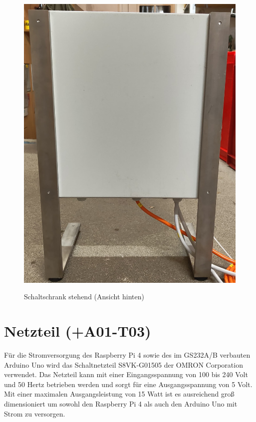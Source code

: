 \begin{figure}[H]
\begin{minipage}[b]{.4\linewidth}
		\includegraphics[width=\linewidth]{../ref/Schaltschrank_stehend_hinten.jpeg}
		\label{fig:schaltschrankstehendhinten}
		\caption{Schaltschrank stehend (Ansicht hinten)}
	\end{minipage}
\end{figure}

\section{Netzteil (+A01-T03)}
Für die Stromversorgung des Raspberry Pi 4 sowie des im GS232A/B verbauten Arduino Uno wird das Schaltnetzteil S8VK-G01505 der OMRON Corporation verwendet. Das Netzteil kann mit einer Eingangsspannung von 100 bis 240 Volt und 50 Hertz betrieben werden und sorgt für eine Ausgangsspannung von 5 Volt. Mit einer maximalen Ausgangsleistung von  15 Watt ist es ausreichend groß dimensioniert um sowohl den Raspberry Pi 4 \cite{noauthor_power_nodate} als auch den Arduino Uno \cite{noauthor_r3_nodate} mit Strom zu versorgen. \cite{noauthor_s8vk-g01505_nodate}

